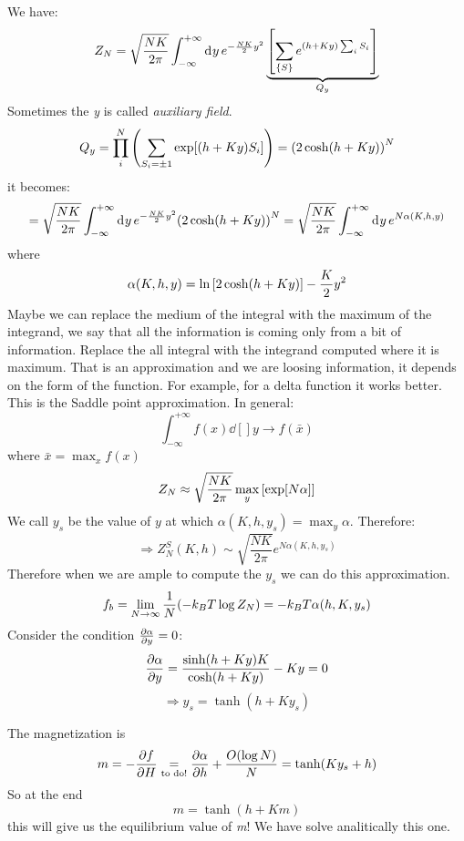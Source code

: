 \documentclass[../main/main.tex]{subfiles}
\begin{document}
We have:
\begin{equation}
  Z_N = \sqrt{\frac{N K}{2 \pi }} \int_{-\infty }^{+ \infty } \dd[]{y} e^{- \frac{NK}{2}y^2} \underbrace{\qty[\sum_{\{ S \}  }^{}  e^{(h+Ky) \sum_{i}^{} S_i  }  ]}_{Q_y}
\end{equation}
Sometimes the \emph{y} is called \emph{auxiliary field}.
\begin{equation}
  Q_y = \prod_{i}^{N} \qty(\sum_{S_i = \pm 1}^{} \exp [ (h+Ky) S_i]  )  = \qty( 2 \cosh (h+Ky))^N
\end{equation}
it becomes:
\begin{equation}
  = \sqrt{\frac{N K}{2 \pi }} \int_{- \infty }^{+ \infty } \dd[]{y} e^{- \frac{NK}{2}y^2} \qty(2 \cosh(h+Ky))^N = \sqrt{\frac{N K}{2 \pi }} \int_{-\infty }^{+\infty } \dd[]{y} e^{N \alpha (K,h,y)}
\end{equation}
where
\begin{equation}
  \alpha (K,h,y) = \ln{\qty[2 \cosh(h+Ky)] } - \frac{K}{2}y^2
\end{equation}
Maybe we can replace the medium of the integral with the maximum of the integrand, we say that all the information is coming only from a bit of information. Replace the all integral with the integrand computed where it is maximum. That is an approximation and we are loosing information, it depends on the form of the function. For example, for a delta function it works better. This is the Saddle point approximation. In general:
\begin{equation}
  \int_{-\infty }^{+ \infty } f(x) \dd[]{y} \rightarrow f(\bar{x} )
\end{equation}
where \( \bar{x} = \max_{x} f(x)  \)
\begin{equation}
  Z_N \approx \sqrt{\frac{N K}{2 \pi }} \max_y \qty[\exp [N \alpha ] ]
\end{equation}
We call \( y_s \) be the value of \( y \) at which \( \alpha (K,h,y_s) = \max_y \alpha  \).
Therefore:
\begin{equation}
  \Rightarrow Z_N^S (K,h) \sim \sqrt{\frac{N K}{2 \pi }} e^{N \alpha (K,h,y_s)}
\end{equation}
Therefore when we are ample to compute the \( y_s \) we can do this approximation.
\begin{equation}
  f_b = \lim_{N \rightarrow \infty } \frac{1}{N} \qty(- k_B T \log{Z_N}) = -k_B T \alpha (h,K,y_s)
\end{equation}
Consider the condition \( \pdv{\alpha }{y} = 0  \):
\begin{equation}
  \pdv{\alpha }{y} = \frac{\sinh (h+Ky)K}{\cosh (h+Ky)} - Ky = 0
\end{equation}
\begin{equation}
  \Rightarrow y_s = \tanh (h+Ky_s)
\end{equation}

The magnetization is
\begin{equation}
  m = - \pdv{f}{H} \underset{\text{to do!}}{=}  \pdv{\alpha }{h}  + \frac{O ( \log{N} )}{N}
  = \tanh (K y_s +h)
\end{equation}
So at the end
\begin{equation}
  m = \tanh (h+Km)
\end{equation}
this will give us the equilibrium value of \emph{m}! We have solve analitically this one. 
\end{document}
